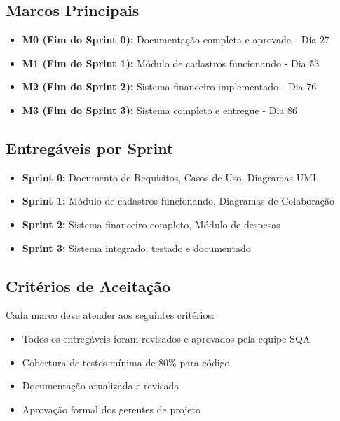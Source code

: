 \subsection{Marcos Principais}
\begin{itemize}
    \item \textbf{M0 (Fim do Sprint 0):} Documentação completa e aprovada - Dia 27
    \item \textbf{M1 (Fim do Sprint 1):} Módulo de cadastros funcionando - Dia 53
    \item \textbf{M2 (Fim do Sprint 2):} Sistema financeiro implementado - Dia 76
    \item \textbf{M3 (Fim do Sprint 3):} Sistema completo e entregue - Dia 86
\end{itemize}

\subsection{Entregáveis por Sprint}
\begin{itemize}
    \item \textbf{Sprint 0:} Documento de Requisitos, Casos de Uso, Diagramas UML
    \item \textbf{Sprint 1:} Módulo de cadastros funcionando, Diagramas de Colaboração
    \item \textbf{Sprint 2:} Sistema financeiro completo, Módulo de despesas
    \item \textbf{Sprint 3:} Sistema integrado, testado e documentado
\end{itemize}

\subsection{Critérios de Aceitação}
Cada marco deve atender aos seguintes critérios:
\begin{itemize}
    \item Todos os entregáveis foram revisados e aprovados pela equipe SQA
    \item Cobertura de testes mínima de 80\% para código
    \item Documentação atualizada e revisada
    \item Aprovação formal dos gerentes de projeto
\end{itemize}
